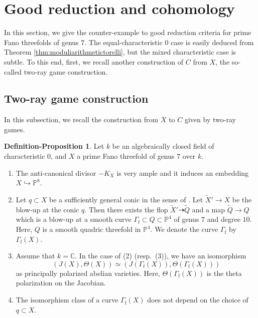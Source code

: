 \documentclass[autodetect-engine, a4paper]{amsart}
\theoremstyle{definition}
\newtheorem{defn-prop}[thm]{Definition-Proposition}
\def\P{{\mathbb P}}
\def\C{{\mathbb C}}
\begin{document}
\section{Good reduction and cohomology}
\label{section:goodredcriteria}
In this section, we give the counter-example to good reduction criteria for prime Fano threefolds of genus $7$.
The equal-characteristic $0$ case is easily deduced from Theorem \ref{thm:moduliarithmetictorelli}, but the mixed characteristic case is subtle.
To this end, first, we recall another construction of $C$ from $X$, the so-called two-ray game construction.

\subsection{Two-ray game construction}
In this subsection, we recall the construction from $X$ to $C$ given by two-ray games.


\begin{defn-prop}
\label{defn-prop:Xtocurveflop}
Let $k$ be an algebraically closed field of characteristic $0$, and $X$ a prime Fano threefold of genus $7$ over $k$.
\begin{enumerate}
\item 
The anti-canonical divisor $-K_{X}$ is very ample and it induces an embedding $X \hookrightarrow \P^{8}$.
\item
Let $q \subset X$ be a sufficiently general conic in the sense of \cite[Theorem 6.5]{Iliev-Markushevich}.
Let $\widetilde{X}' \rightarrow X$ 
be the blow-up at the conic $q$.
Then there exists the flop $\widetilde{X}' \dashrightarrow \widetilde{Q}$ 
and a map
$\widetilde{Q} \rightarrow Q$ which is a blow-up at a smooth curve $\Gamma_{\mathrm{f}} \subset Q \subset \P^4$ of genus $7$ and degree $10$.
Here, $Q$ is a smooth quadric threefold in $\P^4$.
We denote the curve $\Gamma_{\mathrm{f}}$ by $\Gamma_{\mathrm{f}}(X)$.
\item 
Assume that $k = \C$.
In the case of (2) (resp.\ (3)), we have an isomorphism 
\[(J(X), \Theta(X)) \simeq (J(\Gamma_{\mathrm{f}}(X)), \Theta (\Gamma_{\mathrm{f}}(X)))
\]
as principally polarized abelian varieties. Here, $\Theta(\Gamma_{\mathrm{f}}(X))$ is the theta polarization on the Jacobian.
\item 
The isomorphism class of a curve $\Gamma_{\mathrm{f}} (X)$ does not depend on the choice of $q \subset X$.
\end{enumerate}
\end{defn-prop}
\end{document}
